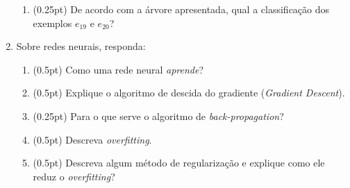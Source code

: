 \documentclass{article}
\begin{document}
\begin{enumerate}
\begin{enumerate}
        \item (0.25pt) De acordo com a árvore apresentada, qual a classificação dos exemplos $e_{19}$ e $e_{20}$?
        
        
    \end{enumerate}
   
   \item Sobre redes neurais, responda:
   
   \begin{enumerate}
    \item (0.5pt) Como uma rede neural \textit{aprende}?
    
    
    \item (0.5pt) Explique o algoritmo de descida do gradiente (\textit{Gradient Descent}).
    
    
    \item (0.25pt) Para o que serve o algoritmo de \textit{back-propagation}?
    
    
    \item (0.5pt) Descreva \textit{overfitting}.
    
    
    \item (0.5pt) Descreva algum método de regularização e explique como ele reduz o \textit{overfitting}?
    
    

\end{enumerate}
\end{enumerate}
\end{document}
